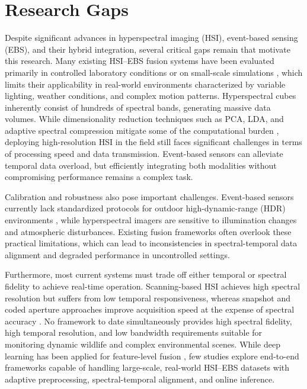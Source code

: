 \documentclass[conference]{IEEEtran}
\begin{document}
\section{Research Gaps}
Despite significant advances in hyperspectral imaging (HSI), event-based sensing (EBS), and their hybrid integration, several critical gaps remain that motivate this research. Many existing HSI–EBS fusion systems have been evaluated primarily in controlled laboratory conditions or on small-scale simulations \cite{zhou2023fusion, wang2022sensorfusion}, which limits their applicability in real-world environments characterized by variable lighting, weather conditions, and complex motion patterns. Hyperspectral cubes inherently consist of hundreds of spectral bands, generating massive data volumes. While dimensionality reduction techniques such as PCA, LDA, and adaptive spectral compression mitigate some of the computational burden \cite{liang2021adaptive, brown2022compression}, deploying high-resolution HSI in the field still faces significant challenges in terms of processing speed and data transmission. Event-based sensors can alleviate temporal data overload, but efficiently integrating both modalities without compromising performance remains a complex task.

Calibration and robustness also pose important challenges. Event-based sensors currently lack standardized protocols for outdoor high-dynamic-range (HDR) environments \cite{gallego2020event}, while hyperspectral imagers are sensitive to illumination changes and atmospheric disturbances. Existing fusion frameworks often overlook these practical limitations, which can lead to inconsistencies in spectral-temporal data alignment and degraded performance in uncontrolled settings.

Furthermore, most current systems must trade off either temporal or spectral fidelity to achieve real-time operation. Scanning-based HSI achieves high spectral resolution but suffers from low temporal responsiveness, whereas snapshot and coded aperture approaches improve acquisition speed at the expense of spectral accuracy \cite{li2023hybrid}. No framework to date simultaneously provides high spectral fidelity, high temporal resolution, and low bandwidth requirements suitable for monitoring dynamic wildlife and complex environmental scenes. While deep learning has been applied for feature-level fusion \cite{reddy2020multimodal, tang2021learning}, few studies explore end-to-end frameworks capable of handling large-scale, real-world HSI–EBS datasets with adaptive preprocessing, spectral-temporal alignment, and online inference.
\end{document}
